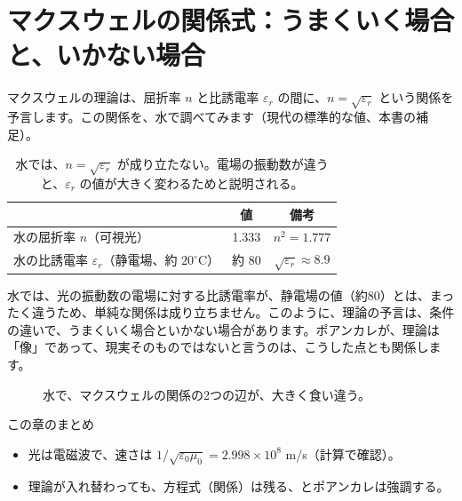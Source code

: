 \documentclass[a4paper,11pt,openany]{ltjsbook}
\begin{document}
\section{マクスウェルの関係式：うまくいく場合と、いかない場合}

マクスウェルの理論は、屈折率 $n$ と比誘電率 $\varepsilon_r$ の間に、$n=\sqrt{\varepsilon_r}$ という関係を予言します。この関係を、水で調べてみます（現代の標準的な値、本書の補足）。

\begin{table}[htbp]
\centering
\begin{tabular}{lcc}
\toprule
 & 値 & 備考\\
\midrule
水の屈折率 $n$（可視光） & 1.333 & $n^2=1.777$\\
水の比誘電率 $\varepsilon_r$（静電場、約 $20^\circ$C） & 約 80 & $\sqrt{\varepsilon_r}\approx8.9$\\
\bottomrule
\end{tabular}
\caption{水では、$n=\sqrt{\varepsilon_r}$ が成り立たない。電場の振動数が違うと、$\varepsilon_r$ の値が大きく変わるためと説明される。}
\end{table}

水では、光の振動数の電場に対する比誘電率が、静電場の値（約80）とは、まったく違うため、単純な関係は成り立ちません。このように、理論の予言は、条件の違いで、うまくいく場合といかない場合があります。ポアンカレが、理論は「像」であって、現実そのものではないと言うのは、こうした点とも関係します。

\begin{figure}[htbp]
\centering
{}
\caption{水で、マクスウェルの関係の2つの辺が、大きく食い違う。}
\end{figure}

\begin{pointbox}{この章のまとめ}
\begin{itemize}[leftmargin=*]
\item 光は電磁波で、速さは $1/\sqrt{\varepsilon_0\mu_0}=2.998\times10^8$ m/s（計算で確認）。
\item 理論が入れ替わっても、方程式（関係）は残る、とポアンカレは強調する。
\end{itemize}
\end{pointbox}
\end{document}
